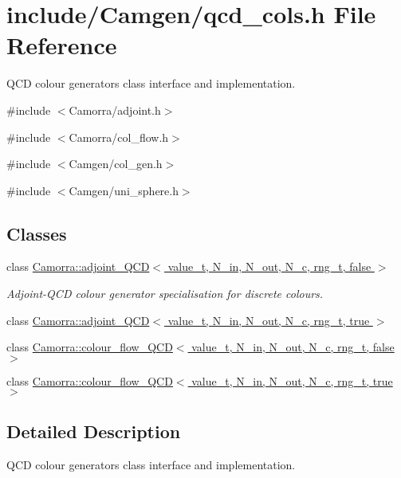 \hypertarget{a00587}{
\section{include/Camgen/qcd\_\-cols.h File Reference}
\label{a00587}
}


QCD colour generators class interface and implementation.  


{\ttfamily \#include $<$Camorra/adjoint.h$>$}\par
{\ttfamily \#include $<$Camorra/col\_\-flow.h$>$}\par
{\ttfamily \#include $<$Camgen/col\_\-gen.h$>$}\par
{\ttfamily \#include $<$Camgen/uni\_\-sphere.h$>$}\par
\subsection*{Classes}
\begin{DoxyCompactItemize}
\item 
class \hyperlink{a00003}{Camorra::adjoint\_\-QCD$<$ value\_\-t, N\_\-in, N\_\-out, N\_\-c, rng\_\-t, false $>$}
\begin{DoxyCompactList}\small\item\em Adjoint-\/QCD colour generator specialisation for discrete colours. \end{DoxyCompactList}\item 
class \hyperlink{a00004}{Camorra::adjoint\_\-QCD$<$ value\_\-t, N\_\-in, N\_\-out, N\_\-c, rng\_\-t, true $>$}
\item 
class \hyperlink{a00073}{Camorra::colour\_\-flow\_\-QCD$<$ value\_\-t, N\_\-in, N\_\-out, N\_\-c, rng\_\-t, false $>$}
\item 
class \hyperlink{a00074}{Camorra::colour\_\-flow\_\-QCD$<$ value\_\-t, N\_\-in, N\_\-out, N\_\-c, rng\_\-t, true $>$}
\end{DoxyCompactItemize}


\subsection{Detailed Description}
QCD colour generators class interface and implementation. 
